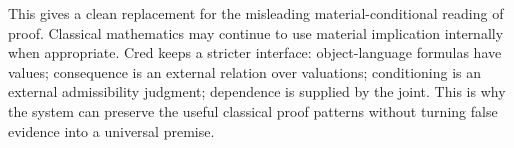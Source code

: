 This gives a clean replacement for the misleading material-conditional
reading of proof.  Classical mathematics may continue to use material
implication internally when appropriate.  Cred keeps a stricter
interface: object-language formulas have values; consequence is an
external relation over valuations; conditioning is an external
admissibility judgment; dependence is supplied by the joint.  This is
why the system can preserve the useful classical proof patterns without
turning false evidence into a universal premise.
